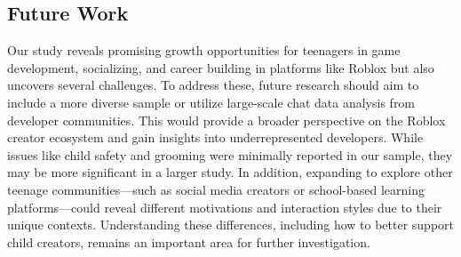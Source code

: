 \subsection{Future Work} %
Our study reveals promising growth opportunities for teenagers in game development, socializing, and career building in platforms like Roblox but also uncovers several challenges. To address these, future research should aim to include a more diverse sample or utilize large-scale chat data analysis from developer communities. This would provide a broader perspective on the Roblox creator ecosystem and gain insights into underrepresented developers.
While issues like child safety and grooming were minimally reported in our sample, they may be more significant in a larger study. In addition, expanding to explore other teenage communities—such as social media creators or school-based learning platforms—could reveal different motivations and interaction styles due to their unique contexts. Understanding these differences, including how to better support child creators, remains an important area for further investigation.


